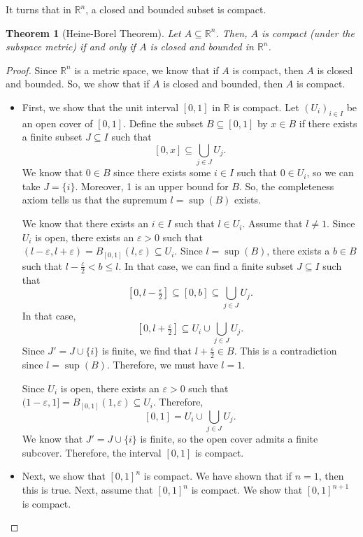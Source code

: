 \documentclass[a4paper, openany]{memoir}
\theoremstyle{definition}
\theoremstyle{plain}
\newtheorem{theorem}[definition]{Theorem}
\begin{document}
It turns that in $\mathbb{R}^n$, a closed and bounded subset is compact.
\begin{theorem}[Heine-Borel Theorem]
Let $A \subseteq \mathbb{R}^n$. Then, $A$ is compact (under the subspace metric) if and only if $A$ is closed and bounded in $\mathbb{R}^n$.
\end{theorem}
\begin{proof}
Since $\mathbb{R}^n$ is a metric space, we know that if $A$ is compact, then $A$ is closed and bounded. So, we show that if $A$ is closed and bounded, then $A$ is compact.
\begin{itemize}
    \item First, we show that the unit interval $[0, 1]$ in $\mathbb{R}$ is compact. Let $(U_i)_{i \in I}$ be an open cover of $[0, 1]$. Define the subset $B \subseteq [0, 1]$ by $x \in B$ if there exists a finite subset $J \subseteq I$ such that
    \[[0, x] \subseteq \bigcup_{j \in J} U_j.\]
    We know that $0 \in B$ since there exists some $i \in I$ such that $0 \in U_i$, so we can take $J = \{i\}$. Moreover, 1 is an upper bound for $B$. So, the completeness axiom tells us that the supremum $l = \sup (B)$ exists. 
    
    We know that there exists an $i \in I$ such that $l \in U_i$. Assume that $l \neq 1$. Since $U_i$ is open, there exists an $\varepsilon > 0$ such that $(l - \varepsilon, l + \varepsilon) = B_{[0, 1]}(l, \varepsilon) \subseteq U_i$. Since $l = \sup(B)$, there exists a $b \in B$ such that $l - \frac{\varepsilon}{2} < b \leqslant l$. In that case, we can find a finite subset $J \subseteq I$ such that
    \[[0, l - \tfrac{\varepsilon}{2}] \subseteq [0, b] \subseteq \bigcup_{j \in J} U_j.\]
    In that case,
    \[[0, l + \tfrac{\varepsilon}{2}] \subseteq U_i \cup \bigcup_{j \in J} U_j.\]
    Since $J' = J \cup \{i\}$ is finite, we find that $l + \frac{\varepsilon}{2} \in B$. This is a contradiction since $l = \sup (B)$. Therefore, we must have $l = 1$. 
    
    Since $U_i$ is open, there exists an $\varepsilon > 0$ such that $(1 - \varepsilon, 1] = B_{[0, 1]}(1, \varepsilon) \subseteq U_i$. Therefore,
    \[[0, 1] = U_i \cup \bigcup_{j \in J} U_j.\]
    We know that $J' = J \cup \{i\}$ is finite, so the open cover admits a finite subcover. Therefore, the interval $[0, 1]$ is compact.
    
    \item Next, we show that $[0, 1]^n$ is compact. We have shown that if $n = 1$, then this is true. Next, assume that $[0, 1]^n$ is compact. We show that $[0, 1]^{n+1}$ is compact.
    

\end{itemize}
\end{proof}
\end{document}

